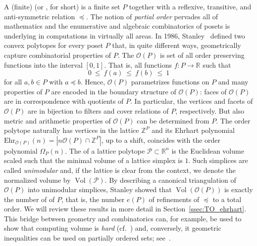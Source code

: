 \documentclass[11pt]{amsart}
\theoremstyle{definition}
\begin{document}
A (finite) {\textbf{\color{black}{partially ordered set}}} (or {\textbf{\color{black}{poset}}}, for short) is a
finite set ${P}$ together with a reflexive, transitive, and anti-symmetric
relation $\preceq$. The notion of \emph{partial order} pervades all of
mathematics and the enumerative and algebraic combinatorics of posets is
underlying in computations in virtually all areas. In 1986,
Stanley~\cite{TwoPoset} defined two convex polytopes for every poset ${P}$
that, in quite different ways, geometrically capture combinatorial properties
of ${P}$.  The {\textbf{\color{black}{order polytope}}} ${\mathcal{O}({P})}$ is set of all order preserving
functions into the interval $[0,1]$. That is, all functions $f : {P}
\rightarrow {\mathbb{R}}$ such that 
\[
    0 \ \le \  f(a) \ \le \ f(b) \ \le \  1
\]
for all $a,b \in {P}$ with $a \preceq b$.  Hence, ${\mathcal{O}({P})}$ parametrizes
functions on ${P}$ and many properties of ${P}$ are encoded in the boundary
structure of ${\mathcal{O}({P})}$: faces of ${\mathcal{O}({P})}$ are in correspondence with
quotients of ${P}$.  In particular, the vertices and facets of ${\mathcal{O}({P})}$ are
in bijection to filters and cover relations of ${P}$, respectively. But also
metric and arithmetic properties of ${\mathcal{O}({P})}$ can be determined from ${P}$.
The order polytope naturally has vertices in the lattice ${\mathbb{Z}}^{P}$ and its
Ehrhart polynomial ${\mathrm{Ehr}}_{{\mathcal{O}({P})}}(n) = |n{\mathcal{O}({P})} \cap {\mathbb{Z}}^{P}|$, up to a
shift, coincides with the order polynomial $\Omega_{P}(n)$. The
{\textbf{\color{black}{normalized volume}}} of a lattice polytope ${\mathcal{P}} \subset {\mathbb{R}}^n$ is the
Euclidean volume scaled such that the minimal volume of a lattice simplex is
$1$. Such simplices are called \emph{unimodular} and, if the lattice is clear
from the context, we denote the normalized volume by $\operatorname{Vol}({\mathcal{P}})$. By
describing a canonical triangulation of ${\mathcal{O}({P})}$ into unimodular simplices,
Stanley showed that $\operatorname{Vol}({\mathcal{O}({P})})$ is exactly the number of {\textbf{\color{black}{linear
extensions}}} of ${P}$, that is, the number $e({P})$ of refinements of $\preceq$
to a total order. We will review these results in more detail in
Section~\ref{ssec:TO_ehrhart}.  This bridge between geometry and combinatorics
can, for example, be used to show that computing volume is \emph{hard}
(cf.~\cite{BW}) and, conversely, it geometric inequalities can be 
used on partially ordered sets; see~\cite{KN,TwoPoset}. 
\end{document}
